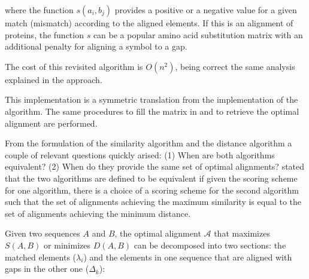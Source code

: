 where the function $s(a_i,b_j)$ provides a positive or a negative value for a given match (mismatch) 
according to the aligned elements. If this is an alignment of proteins, the function $s$ can be  
a popular amino acid substitution matrix with an additional penalty for aligning a symbol to 
a gap.

The cost of this revisited \citeauthor{needleman:1970a} algorithm is $O(n^2)$, being correct the same
analysis explained in the \citeauthor{sellers:1974a} approach.


This implementation is a symmetric translation from the implementation of the \citeauthor{needleman:1970a} 
algorithm. The same procedures to fill the matrix in and to retrieve the optimal alignment are performed.

\label{simdist}

From the formulation of the \citeauthor{needleman:1970a} similarity algorithm and 
the \citeauthor{sellers:1974a} distance algorithm a couple of relevant questions quickly arised:
(1) When are both algorithms equivalent? (2) When do they provide the same set of optimal alignments?
\citet{smith:1981a} stated that the two algorithms are defined to be equivalent if given the
scoring scheme for one algorithm, there is a choice of a scoring scheme for the second algorithm such that
the set of alignments achieving the maximum similarity is equal to the set of alignments achieving the
minimum distance.

Given two sequences $A$ and $B$, the optimal alignment $\mathcal{A}$ that maximizes $S(A,B)$ or minimizes 
$D(A,B)$ can be decomposed into two sections: the matched elements ($\lambda_i$) and the elements in one sequence
that are aligned with gaps in the other one ($\Delta_k$):

\begin{center}
\end{center}

